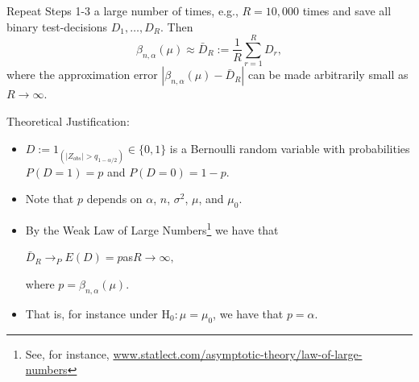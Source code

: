 \documentclass[a4paper]{article}
\begin{document}
Repeat Steps 1-3 a large number of times, e.g., $R=10,000$ times and save all binary test-decisions $D_1,\dots,D_R$. Then 
$$
\beta_{n,\alpha}(\mu)\approx \bar{D}_R:=\frac{1}{R}\sum_{r=1}^R D_r,
$$
where the approximation error $|\beta_{n,\alpha}(\mu)-\bar{D}_R|$ can be made arbitrarily small as $R\to\infty$.

\bigskip

{\sc Theoretical Justification:}
\begin{itemize}[leftmargin=0.3cm]
\item $D:=1_{(|Z_{obs}|>q_{1-\alpha/2})}\in\{0,1\}$ is a Bernoulli random variable with  probabilities $P\left(D=1\right)=p$ \quad and \quad $P\left(D=0\right)=1-p$. 
\item Note that $p$ depends on $\alpha$, $n$, $\sigma^2$, $\mu$, and $\mu_0$.%
\item By the Weak Law of Large Numbers\footnote{See, for instance, \url{www.statlect.com/asymptotic-theory/law-of-large-numbers}} we have that 
\begin{center}
  $\displaystyle\bar{D}_R\to_{P}E(D)=p$\quad as\quad $\displaystyle R\to\infty,$
\end{center}
where $p=\beta_{n,\alpha}(\mu)$.
\item That is, for instance under H$_0:\mu=\mu_0$, we have that $p=\alpha$. 
\end{itemize}
\end{document}
